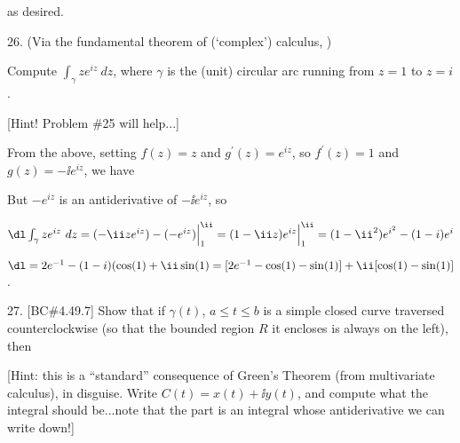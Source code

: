 \ssk


\ssk

\item{} as desired.

\bsk

\item{26.} (Via the fundamental theorem of (`complex') calculus, ) 

\item{} Compute $\int_\gamma ze^{iz}\ dz$, where
$\gamma$ is the (unit) circular arc running from $z=1$ to $z=i$.

\item{} [Hint! Problem \#25 will help...]

\ssk

\item{} From the above, setting $f(z)=z$ and $g^\prime(z)=e^{iz}$, so $f^\prime(z)=1$ and $g(z)=-\ii e^{iz}$, we have

\ssk


\ssk

\item{} But $-e^{iz}$ is an antiderivative of $-\ii e^{iz}$, so 

\item{} $\dl\int_\gamma ze^{iz}\ dz = (-\ii ze^{iz})-(-e^{iz})\Big|_1^\ii
= (1-\ii z)e^{iz}\Big|_1^\ii = (1-\ii^2)e^{i^2}-(1-i)e^i$

\hfill $\dl = 2e^{-1}-(1-i)(\cos(1)+\ii\sin(1)
= [2e^{-1}-\cos(1)-\sin(1)]+\ii[\cos(1)-\sin(1)]$ .

\bsk

\item{27.} [BC\#4.49.7] Show that if $\gamma(t)$, $a\leq t\leq b$ is a simple closed curve 
traversed counterclockwise (so that the bounded
region $R$ it encloses is always on the left), then 

\ssk


\ssk

\item{} [Hint: this is a ``standard'' consequence of Green's Theorem (from multivariate calculus), in disguise.
Write $C(t)=x(t)+\ii y(t)$, and compute what the integral should be...note that the  part is an integral
whose antiderivative we can write down!]
 
